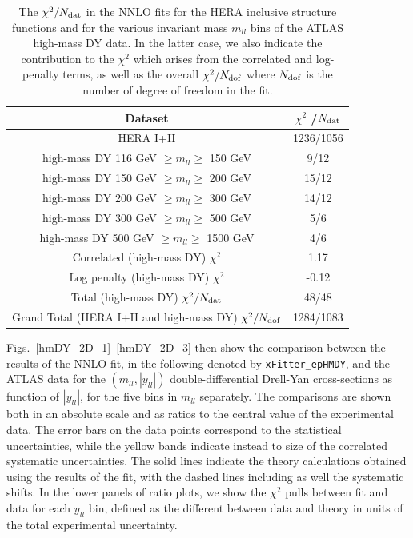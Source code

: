 \begin{table}[t]
  \centering
  \begin{tabular}{|c|c|}
    \hline
    Dataset  &   $\chi^2$ /$N_{\rm dat}$ \\
    \hline
    \hline
    HERA I+II & 1236/1056\\
    \hline
    high-mass DY  116 GeV $\ge m_{ll} \ge $ 150 GeV  &  9/12 \\
    high-mass DY  150 GeV $\ge m_{ll} \ge $ 200 GeV  &  15/12 \\
    high-mass DY  200 GeV $\ge m_{ll} \ge $ 300 GeV  &  14/12 \\
    high-mass DY  300 GeV $\ge m_{ll} \ge $ 500 GeV  &  5/6 \\
    high-mass DY  500 GeV $\ge m_{ll} \ge $ 1500 GeV &  4/6 \\
    \hline
    Correlated (high-mass DY) $\chi^2$ & 1.17 \\
    Log penalty (high-mass DY) $\chi^2$  & -0.12 \\
    \hline
    Total  (high-mass DY) $\chi^2/N_{\rm dat}$  & 48/48 \\
    \hline
    Grand Total (HERA I+II and high-mass DY) $\chi^2/N_{\rm dof}$   & 1284/1083 \\
    \hline
    \end{tabular}
  \caption{The $\chi^{2}/N_{\rm dat}$ in the NNLO fits for the
    HERA inclusive structure functions and for the various
    invariant mass $m_{ll}$ bins of the ATLAS high-mass DY data.
    In the latter case, we also indicate the contribution to the
    $\chi^2$ which arises from the correlated and log-penalty terms,
    as well as the overall $\chi^2/N_{\rm dof}$ where $N_{\rm dof}$ is
    the number of degree of freedom in the fit.
\label{tab:chi2fit}
  }
\end{table}

Figs.~\ref{hmDY_2D_1}--\ref{hmDY_2D_3} then show the
comparison between the results of the NNLO fit, in the following
denoted by {\tt xFitter\_epHMDY},
and the ATLAS data
  for the $(m_{ll},|y_{ll}|)$ double-differential Drell-Yan cross-sections
  as function of $|y_{ll}|$, for the five bins in $m_{ll}$ separately.
  The comparisons are shown both
  in an absolute scale  and as ratios to the central value
  of the experimental data.
  The error bars on the data points correspond to the statistical
  uncertainties, while the yellow bands
  indicate instead to size of the correlated systematic uncertainties.
  The solid lines indicate the theory calculations obtained using the results
  of the fit, with the dashed lines including as well the systematic shifts.
  In the lower panels of ratio plots,
  we show the $\chi^2$ pulls between fit and data for each $y_{ll}$ bin,
  defined as the different between data and theory in units
  of the total experimental uncertainty.


